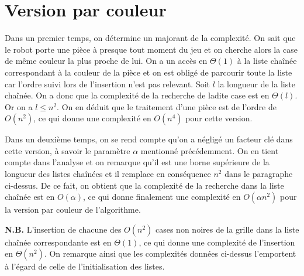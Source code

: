 \documentclass[12pt,a4paper]{article}
\begin{document}
\section{Version par couleur} \label{par_couleur}
Dans un premier temps, on d\'etermine un majorant de la complexit\'e. On sait 
que le robot porte une pi\`ece \`a presque tout moment du jeu et on cherche 
alors la case de m\^eme couleur la plus proche de lui. On a un acc\`es en 
$\Theta(1)$ \`a la liste cha\^in\'ee correspondant \`a la couleur de la pi\`ece 
et on est oblig\'e de parcourir toute la liste car l'ordre suivi lors de 
l'insertion n'est pas relevant. Soit $l$ la longueur de la liste cha\^in\'ee. On 
a donc que la complexit\'e de la recherche de ladite case est en $\Theta(l)$. Or 
on a $l \leq n^2$. On en d\'eduit que le traitement d'une pi\`ece est de l'ordre 
de $O(n^2)$, ce qui donne une complexit\'e en $O(n^4)$ pour cette version. 

Dans un deuxi\`eme temps, on se rend compte qu'on a n\'eglig\'e un facteur cl\'e 
dans cette version, \`a savoir le param\`etre $\alpha$ mentionn\'e 
pr\'ec\'edemment. On en tient compte dans l'analyse et on remarque qu'il est une 
borne sup\'erieure de la longueur des listes cha\^in\'ees et il remplace en 
cons\'equence $n^2$ dans le paragraphe ci-dessus. De ce fait, on obtient que la 
complexit\'e de la recherche dans la liste cha\^in\'ee est en $O(\alpha)$, ce 
qui donne finalement une complexit\'e en $O(\alpha n^2)$ pour la version par 
couleur de l'algorithme.

{\bfseries N.B.} L'insertion de chacune des $O(n^2)$ cases non noires de la 
grille dans la liste cha\^in\'ee correspondante est en $\Theta(1)$, ce qui donne 
une complexit\'e de l'insertion en $\Theta(n^2)$. On remarque ainsi que les 
complexit\'es donn\'ees ci-dessus l'emportent \`a l'\'egard de celle de 
l'initialisation des listes.

\end{document}
